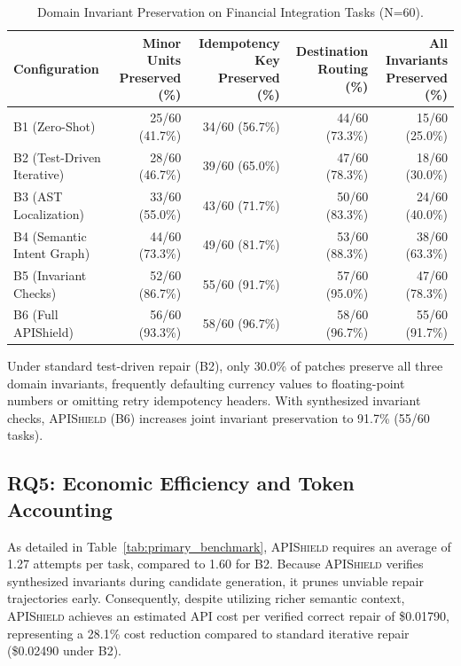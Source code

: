 \begin{table}[t]
\centering\small
\caption{Domain Invariant Preservation on Financial Integration Tasks (N=60).}
\label{tab:financial_invariants}
\begin{tabular}{lrrrr}
\toprule
Configuration & Minor Units Preserved (\%) & Idempotency Key Preserved (\%) & Destination Routing (\%) & All Invariants Preserved (\%) \\
\midrule
B1 (Zero-Shot) & 25/60 (41.7\%) & 34/60 (56.7\%) & 44/60 (73.3\%) & 15/60 (25.0\%) \\
B2 (Test-Driven Iterative) & 28/60 (46.7\%) & 39/60 (65.0\%) & 47/60 (78.3\%) & 18/60 (30.0\%) \\
B3 (AST Localization) & 33/60 (55.0\%) & 43/60 (71.7\%) & 50/60 (83.3\%) & 24/60 (40.0\%) \\
B4 (Semantic Intent Graph) & 44/60 (73.3\%) & 49/60 (81.7\%) & 53/60 (88.3\%) & 38/60 (63.3\%) \\
B5 (Invariant Checks) & 52/60 (86.7\%) & 55/60 (91.7\%) & 57/60 (95.0\%) & 47/60 (78.3\%) \\
B6 (Full APIShield) & 56/60 (93.3\%) & 58/60 (96.7\%) & 58/60 (96.7\%) & 55/60 (91.7\%) \\
\bottomrule
\end{tabular}
\end{table}

Under standard test-driven repair (B2), only 30.0\% of patches preserve all three domain invariants, frequently defaulting currency values to floating-point numbers or omitting retry idempotency headers. With synthesized invariant checks, \textsc{APIShield} (B6) increases joint invariant preservation to 91.7\% (55/60 tasks).

\subsection{RQ5: Economic Efficiency and Token Accounting}
As detailed in Table~\ref{tab:primary_benchmark}, \textsc{APIShield} requires an average of 1.27 attempts per task, compared to 1.60 for B2. Because \textsc{APIShield} verifies synthesized invariants during candidate generation, it prunes unviable repair trajectories early. Consequently, despite utilizing richer semantic context, \textsc{APIShield} achieves an estimated API cost per verified correct repair of \$0.01790, representing a 28.1\% cost reduction compared to standard iterative repair (\$0.02490 under B2).

